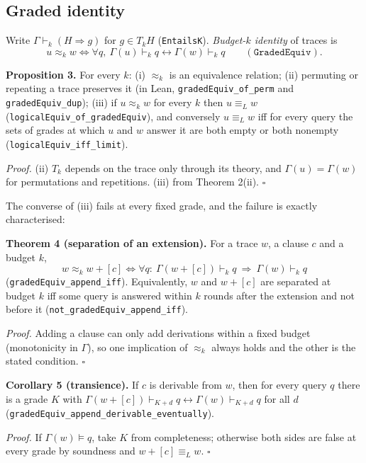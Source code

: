 \subsection{Graded identity}\label{graded-identity}

Write \(\Gamma\vdash_k(H\Rightarrow g)\) for \(g\in T_kH\) (\texttt{EntailsK}). \emph{Budget-\(k\) identity} of traces is \[u\approx_kw\iff\forall q,\ \Gamma(u)\vdash_kq\leftrightarrow\Gamma(w)\vdash_kq\qquad(\texttt{GradedEquiv}).\]

\textbf{Proposition 3.} For every \(k\): (i) \(\approx_k\) is an equivalence relation; (ii) permuting or repeating a trace preserves it (in Lean, \texttt{gradedEquiv\_of\_perm} and \texttt{gradedEquiv\_dup}); (iii) if \(u\approx_kw\) for every \(k\) then \(u\equiv_Lw\) (\texttt{logicalEquiv\_of\_gradedEquiv}), and conversely \(u\equiv_Lw\) iff for every query the sets of grades at which \(u\) and \(w\) answer it are both empty or both nonempty (\texttt{logicalEquiv\_iff\_limit}).

\emph{Proof.} (ii) \(T_k\) depends on the trace only through its theory, and \(\Gamma(u)=\Gamma(w)\) for permutations and repetitions. (iii) from Theorem 2(ii). \(\square\)

The converse of (iii) fails at every fixed grade, and the failure is exactly characterised:

\textbf{Theorem 4 (separation of an extension).} For a trace \(w\), a clause \(c\) and a budget \(k\), \[w\approx_kw{+}[c]\iff\forall q:\ \Gamma(w{+}[c])\vdash_kq\ \Rightarrow\ \Gamma(w)\vdash_kq\] (\texttt{gradedEquiv\_append\_iff}). Equivalently, \(w\) and \(w{+}[c]\) are separated at budget \(k\) iff some query is answered within \(k\) rounds after the extension and not before it (\texttt{not\_gradedEquiv\_append\_iff}).

\emph{Proof.} Adding a clause can only add derivations within a fixed budget (monotonicity in \(\Gamma\)), so one implication of \(\approx_k\) always holds and the other is the stated condition. \(\square\)

\textbf{Corollary 5 (transience).} If \(c\) is derivable from \(w\), then for every query \(q\) there is a grade \(K\) with \(\Gamma(w{+}[c])\vdash_{K+d}q\leftrightarrow\Gamma(w)\vdash_{K+d}q\) for all \(d\) (\texttt{gradedEquiv\_append\_derivable\_eventually}).

\emph{Proof.} If \(\Gamma(w)\models q\), take \(K\) from completeness; otherwise both sides are false at every grade by soundness and \(w{+}[c]\equiv_Lw\). \(\square\)

